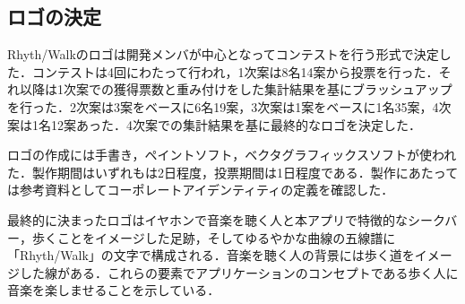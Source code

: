 \subsection{ロゴの決定}
\par Rhyth/Walkのロゴは開発メンバが中心となってコンテストを行う形式で決定した．コンテストは4回にわたって行われ，1次案は8名14案から投票を行った．それ以降は1次案での獲得票数と重み付けをした集計結果を基にブラッシュアップを行った．2次案は3案をベースに6名19案，3次案は1案をベースに1名35案，4次案は1名12案あった．4次案での集計結果を基に最終的なロゴを決定した．
\par ロゴの作成には手書き，ペイントソフト，ベクタグラフィックスソフトが使われた．製作期間はいずれもは2日程度，投票期間は1日程度である．製作にあたっては参考資料としてコーポレートアイデンティティの定義を確認した．
\par 最終的に決まったロゴはイヤホンで音楽を聴く人と本アプリで特徴的なシークバー，歩くことをイメージした足跡，そしてゆるやかな曲線の五線譜に「Rhyth/Walk」の文字で構成される．音楽を聴く人の背景には歩く道をイメージした線がある．これらの要素でアプリケーションのコンセプトである歩く人に音楽を楽しませることを示している．
